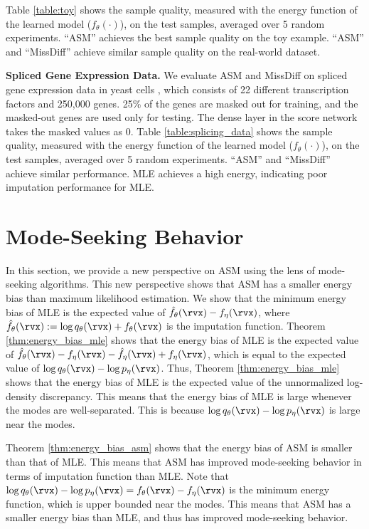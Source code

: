 \documentclass{article} %
\begin{document}
Table \ref{table:toy} shows the sample quality, measured with the energy function of the learned model ($f_{\theta}(\cdot)$), on the test samples, averaged over 5 random experiments. ``ASM'' achieves the best sample quality on the toy example. ``ASM'' and ``MissDiff'' achieve similar sample quality on the real-world dataset.

\textbf{Spliced Gene Expression Data.}
We evaluate ASM and MissDiff on spliced gene expression data in yeast cells \citep{Brem2005}, which consists of 22 different transcription factors and 250,000 genes. 25\% of the genes are masked out for training, and the masked-out genes are used only for testing. The dense layer in the score network takes the masked values as $0$. Table \ref{table:splicing_data} shows the sample quality, measured with the energy function of the learned model ($f_{\theta}(\cdot)$), on the test samples, averaged over 5 random experiments. ``ASM'' and ``MissDiff'' achieve similar performance. MLE achieves a high energy, indicating poor imputation performance for MLE.


\section{Mode-Seeking Behavior}

\label{sec:mode_seeking}
In this section, we provide a new perspective on ASM using the lens of mode-seeking algorithms. This new perspective shows that ASM has a smaller energy bias than maximum likelihood estimation. We show that the minimum energy bias of MLE is the expected value of $\hat{f}_{\theta}(\rvx) - f_{\eta}(\rvx)$, where $\hat{f}_{\theta}(\rvx) := \log q_{\theta}(\rvx) + f_{\theta}(\rvx)$ is the imputation function. Theorem \ref{thm:energy_bias_mle} shows that the energy bias of MLE is the expected value of $\hat{f}_{\theta}(\rvx) - f_{\eta}(\rvx) - \hat{f}_{\eta}(\rvx) + f_{\eta}(\rvx)$, which is equal to the expected value of $\log q_{\theta}(\rvx) - \log p_{\eta}(\rvx)$. Thus, Theorem \ref{thm:energy_bias_mle} shows that the energy bias of MLE is the expected value of the unnormalized log-density discrepancy. This means that the energy bias of MLE is large whenever the modes are well-separated. This is because $\log q_{\theta}(\rvx) - \log p_{\eta}(\rvx)$ is large near the modes.

Theorem \ref{thm:energy_bias_asm} shows that the energy bias of ASM is smaller than that of MLE. This means that ASM has improved mode-seeking behavior in terms of imputation function than MLE. Note that $\log q_{\theta}(\rvx) - \log p_{\eta}(\rvx) = f_{\theta}(\rvx) - f_{\eta}(\rvx)$ is the minimum energy function, which is upper bounded near the modes. This means that ASM has a smaller energy bias than MLE, and thus has improved mode-seeking behavior.
\end{document}
